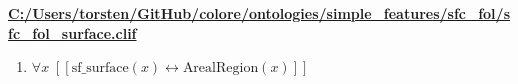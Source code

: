 \documentclass{article}
\begin{document}
\textbf{\url{C:/Users/torsten/GitHub/colore/ontologies/simple\_features/sfc\_fol/sfc\_fol\_surface.clif}}

\begin{enumerate}
\item $\forall x\;  \left[ \left[ \textrm{sf\_surface}(x) \leftrightarrow \textrm{ArealRegion}(x) \right] \right]$
\end{enumerate}
\end{document}
